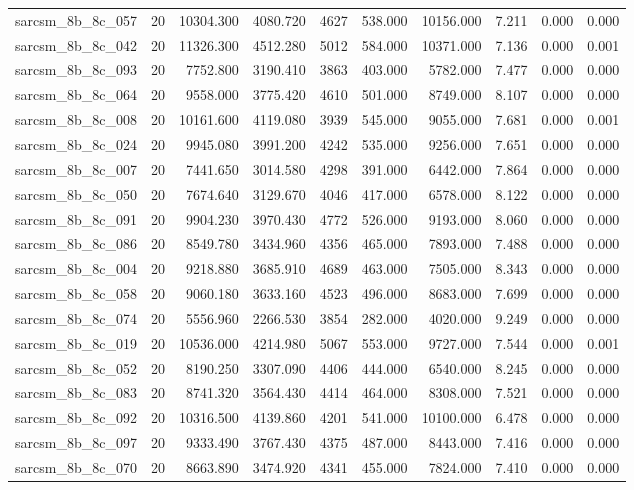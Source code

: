 \begin{tabular}{lrrrrrrrrr}
sarcsm\_8b\_8c\_057 & 20 & 10304.300 & 4080.720 & 4627 & 538.000 & 10156.000 & 7.211 & 0.000 & 0.000 \\
sarcsm\_8b\_8c\_042 & 20 & 11326.300 & 4512.280 & 5012 & 584.000 & 10371.000 & 7.136 & 0.000 & 0.001 \\
sarcsm\_8b\_8c\_093 & 20 & 7752.800 & 3190.410 & 3863 & 403.000 & 5782.000 & 7.477 & 0.000 & 0.000 \\
sarcsm\_8b\_8c\_064 & 20 & 9558.000 & 3775.420 & 4610 & 501.000 & 8749.000 & 8.107 & 0.000 & 0.000 \\
sarcsm\_8b\_8c\_008 & 20 & 10161.600 & 4119.080 & 3939 & 545.000 & 9055.000 & 7.681 & 0.000 & 0.001 \\
sarcsm\_8b\_8c\_024 & 20 & 9945.080 & 3991.200 & 4242 & 535.000 & 9256.000 & 7.651 & 0.000 & 0.000 \\
sarcsm\_8b\_8c\_007 & 20 & 7441.650 & 3014.580 & 4298 & 391.000 & 6442.000 & 7.864 & 0.000 & 0.000 \\
sarcsm\_8b\_8c\_050 & 20 & 7674.640 & 3129.670 & 4046 & 417.000 & 6578.000 & 8.122 & 0.000 & 0.000 \\
sarcsm\_8b\_8c\_091 & 20 & 9904.230 & 3970.430 & 4772 & 526.000 & 9193.000 & 8.060 & 0.000 & 0.000 \\
sarcsm\_8b\_8c\_086 & 20 & 8549.780 & 3434.960 & 4356 & 465.000 & 7893.000 & 7.488 & 0.000 & 0.000 \\
sarcsm\_8b\_8c\_004 & 20 & 9218.880 & 3685.910 & 4689 & 463.000 & 7505.000 & 8.343 & 0.000 & 0.000 \\
sarcsm\_8b\_8c\_058 & 20 & 9060.180 & 3633.160 & 4523 & 496.000 & 8683.000 & 7.699 & 0.000 & 0.000 \\
sarcsm\_8b\_8c\_074 & 20 & 5556.960 & 2266.530 & 3854 & 282.000 & 4020.000 & 9.249 & 0.000 & 0.000 \\
sarcsm\_8b\_8c\_019 & 20 & 10536.000 & 4214.980 & 5067 & 553.000 & 9727.000 & 7.544 & 0.000 & 0.001 \\
sarcsm\_8b\_8c\_052 & 20 & 8190.250 & 3307.090 & 4406 & 444.000 & 6540.000 & 8.245 & 0.000 & 0.000 \\
sarcsm\_8b\_8c\_083 & 20 & 8741.320 & 3564.430 & 4414 & 464.000 & 8308.000 & 7.521 & 0.000 & 0.000 \\
sarcsm\_8b\_8c\_092 & 20 & 10316.500 & 4139.860 & 4201 & 541.000 & 10100.000 & 6.478 & 0.000 & 0.000 \\
sarcsm\_8b\_8c\_097 & 20 & 9333.490 & 3767.430 & 4375 & 487.000 & 8443.000 & 7.416 & 0.000 & 0.000 \\
sarcsm\_8b\_8c\_070 & 20 & 8663.890 & 3474.920 & 4341 & 455.000 & 7824.000 & 7.410 & 0.000 & 0.000 \\

\end{tabular}
